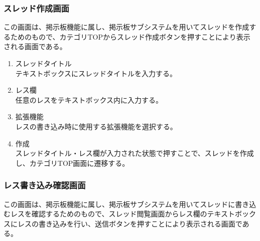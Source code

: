 \documentclass[a4j]{jarticle}
\begin{document}
\subsubsection{スレッド作成画面}
この画面は、掲示板機能に属し、掲示板サブシステムを用いてスレッドを作成するためのもので、カテゴリTOPからスレッド作成ボタンを押すことにより表示される画面である。\\
\begin{enumerate}
  \renewcommand{\labelenumi}{\textcircled{\scriptsize \theenumi}}

\item スレッドタイトル\\
テキストボックスにスレッドタイトルを入力する。

\item レス欄\\
任意のレスをテキストボックス内に入力する。

\item 拡張機能\\
レスの書き込み時に使用する拡張機能を選択する。

\item 作成\\
スレッドタイトル・レス欄が入力された状態で押すことで、スレッドを作成し、カテゴリTOP画面に遷移する。
\end{enumerate}

\subsubsection{レス書き込み確認画面}
この画面は、掲示板機能に属し、掲示板サブシステムを用いてスレッドに書き込むレスを確認するためのもので、スレッド閲覧画面からレス欄のテキストボックスにレスの書き込みを行い、送信ボタンを押すことにより表示される画面である。
\end{document}
